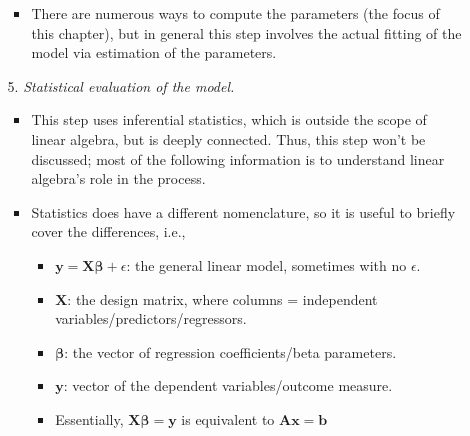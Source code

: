 \begin{itemize}
\begin{itemize}
\begin{itemize}
        \item There are numerous ways to compute the parameters (the focus of this chapter), but in general this step involves the actual fitting of the model via estimation of the parameters.
      \end{itemize}
    \item[5.] \emph{Statistical evaluation of the model.}
      \begin{itemize}
        \item This step uses inferential statistics, which is outside the scope of linear algebra, but is deeply connected. Thus, this step won't be discussed; most of the following information is to understand linear algebra's role in the process.
        \item Statistics does have a different nomenclature, so it is useful to briefly cover the differences, i.e.,
        \begin{itemize}
          \item \(\bm{y} = \bm{X\beta} + {\epsilon} \): the general linear model, sometimes with no \({\epsilon} \).
          \item \(\bm{X}\): the design matrix, where columns = independent variables/predictors/regressors.
          \item \(\bm{\beta}\): the vector of regression coefficients/beta parameters.
          \item \(\bm{y}\): vector of the dependent variables/outcome measure.
          \item Essentially, \(\bm{X\beta} = \bm{y}\) is equivalent to \(\bm{Ax}=\bm{b}\)
        \end{itemize}
      \end{itemize}
  \end{itemize}
  
\end{itemize}

